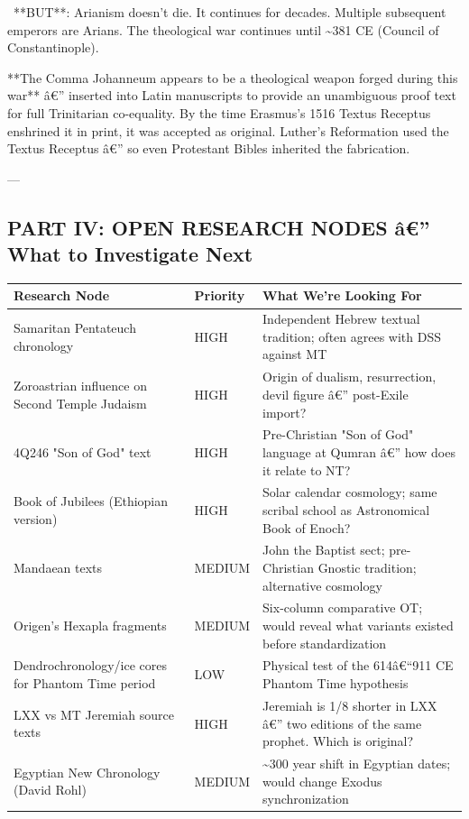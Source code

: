 \documentclass[aps,prd,11pt,onecolumn,superscriptaddress,nofootinbib,floatfix]{revtex4-2}
\begin{document}
\textbullet~**BUT**: Arianism doesn't die. It continues for decades. Multiple subsequent emperors are Arians. The theological war continues until \textasciitilde{}381 CE (Council of Constantinople).



**The Comma Johanneum appears to be a theological weapon forged during this war** â€'' inserted into Latin manuscripts to provide an unambiguous proof text for full Trinitarian co-equality. By the time Erasmus's 1516 Textus Receptus enshrined it in print, it was accepted as original. Luther's Reformation used the Textus Receptus â€'' so even Protestant Bibles inherited the fabrication.


---


\subsection{PART IV: OPEN RESEARCH NODES â€'' What to Investigate Next}


\begin{table}[h!]
\centering
\begin{tabular}{p{3cm}p{3cm}p{3cm}}
\hline
Research Node & Priority & What We're Looking For \\
\hline
Samaritan Pentateuch chronology & HIGH & Independent Hebrew textual tradition; often agrees with DSS against MT \\
Zoroastrian influence on Second Temple Judaism & HIGH & Origin of dualism, resurrection, devil figure â€'' post-Exile import? \\
4Q246 "Son of God" text & HIGH & Pre-Christian "Son of God" language at Qumran â€'' how does it relate to NT? \\
Book of Jubilees (Ethiopian version) & HIGH & Solar calendar cosmology; same scribal school as Astronomical Book of Enoch? \\
Mandaean texts & MEDIUM & John the Baptist sect; pre-Christian Gnostic tradition; alternative cosmology \\
Origen's Hexapla fragments & MEDIUM & Six-column comparative OT; would reveal what variants existed before standardization \\
Dendrochronology/ice cores for Phantom Time period & LOW & Physical test of the 614â€``911 CE Phantom Time hypothesis \\
LXX vs MT Jeremiah source texts & HIGH & Jeremiah is 1/8 shorter in LXX â€'' two editions of the same prophet. Which is original? \\
Egyptian New Chronology (David Rohl) & MEDIUM & \textasciitilde{}300 year shift in Egyptian dates; would change Exodus synchronization \\
\hline
\end{tabular}
\end{table}
\end{document}
